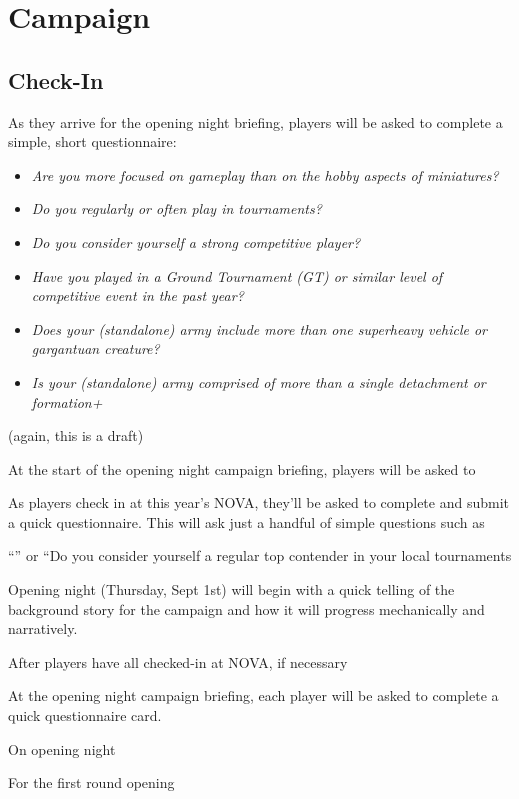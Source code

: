 \makeatletter\@openrightfalse
\chapter{Campaign}
\@openrighttrue\makeatother


\section{Check-In}

As they arrive for the opening night briefing, players will be asked
to complete a simple, short questionnaire:

\begin{itemize}
\item \emph{Are you more focused on gameplay than on the hobby aspects of miniatures?}
\item \emph{Do you regularly or often play in tournaments?}
\item \emph{Do you consider yourself a strong competitive player?}
\item \emph{Have you played in a Ground Tournament (GT) or similar
    level of competitive event in the past year?}
\item \emph{Does your (standalone) army include more than one superheavy vehicle or gargantuan creature?}

\item \emph{Is your (standalone) army comprised of more than a single detachment or formation+}
\end{itemize}

(again, this is a draft)


At the start of the opening night campaign briefing, players will be asked
to 

As players check in at this year's NOVA, they'll be asked to complete and submit a quick
questionnaire.  This will ask just a handful of simple questions such as


``'' or ``Do you consider
yourself a regular top contender in your local tournaments

Opening night (Thursday, Sept 1st) will begin with a quick telling of
the background story for the campaign and how it will progress
mechanically and narratively.  

After players have all checked-in at NOVA, if necessary

At the opening night campaign briefing, each player will be asked to
complete a quick questionnaire card.


On opening night

For the first round opening 

